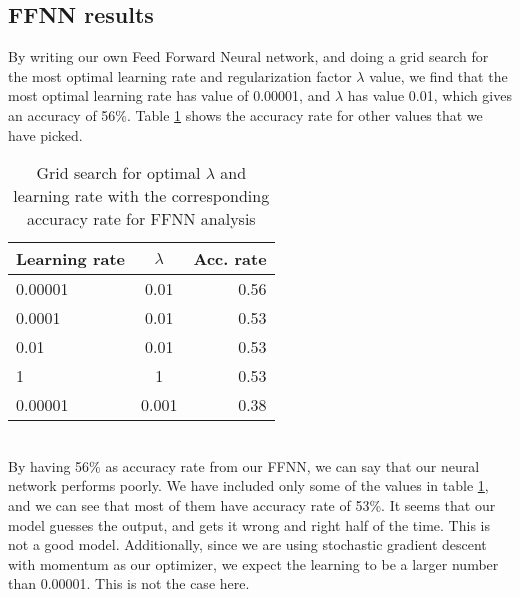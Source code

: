 \documentclass[reprint,english,notitlepage]{revtex4-1}  %
\begin{document}
\subsection{FFNN results}
By writing our own Feed Forward Neural network, and doing a grid search for the most optimal learning rate and regularization factor $\lambda$ value, we find that the most optimal learning rate has value of 0.00001, and $\lambda$ has value 0.01, which gives an accuracy of 56\%. Table \ref{table:grid-search} shows the accuracy rate for other values that we have picked.
\\
\begin{table}[h!] %
  \begin{center}
    \caption{Grid search for optimal $\lambda$ and learning rate with the corresponding accuracy rate for FFNN analysis} %
    \label{table:grid-search}
    \begin{tabular}{l|c|r } %
    \hline
      \textbf{Learning rate} & $\lambda$ & \textbf{Acc. rate}\\ %
      \hline %
      0.00001 & 0.01 & 0.56\\
      0.0001 & 0.01 & 0.53\\
      0.01 & 0.01 & 0.53\\
      1 & 1 & 0.53\\
      0.00001 & 0.001 & 0.38\\ 
      
    \end{tabular}
  \end{center}
\end{table}
\\
By having 56\% as accuracy rate from our FFNN, we can say that our neural network performs poorly. We have included only some of the values in table \ref{table:grid-search}, and we can see that most of them have accuracy rate of 53\%. It seems that our model guesses the output, and gets it wrong and right half of the time. This is not a good model. Additionally, since we are using stochastic gradient descent with momentum as our optimizer, we expect the learning to be a larger number than 0.00001. This is not the case here. 
\end{document}
